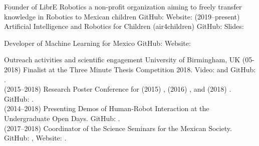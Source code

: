 \documentclass[10pt,a4paper,roman]{moderncv}
\begin{document}
{Founder of LibrE Robotics}
{a non-profit organization aiming to freely transfer 
knowledge in Robotics to Mexican children}
{GitHub: \href{https://github.com/librerobotics}{\faGithubAlt} }
{Website: \href{https://sites.google.com/site/LibreRobotics/}{\faExternalLink}}
{(2019--present) Artificial Intelligence and Robotics for Children (air4children) 
GitHub: \href{https://github.com/librerobotics/air4children}{\faGithubAlt}
Slides: \href{https://github.com/librerobotics/air4children/blob/master/docs/slides/presentation.air4children.pdf}{\faFilePdfO} 
}
{}  



{Developer of Machine Learning for Mexico}
{}
{GitHub: \href{https://github.com/ML4MX}{\faGithubAlt} }
{Website: \href{https://ml4mx.github.io/website/}{\faExternalLink}}
{}  %



{Outreach activities and scientific engagement}
{University of Birmingham, UK}
{}{}
{
(05-2018) Finalist at the Three Minute Thesis Competition 2018.
Video: \href{https://www.youtube.com/watch?v=07ewRYcS-0g}{\faYoutube} and 
GitHub: \href{https://github.com/mxochicale/3mt}{\faGithubAlt}. \\  
(2015--2018) Research Poster Conference for 
(2015) \href{https://github.com/mxochicale/PhD/blob/master/posters/Research_Poster_Conference_UoB/2015/poster/poster.pdf}{\faImage}, 
(2016) \href{https://github.com/mxochicale/PhD/blob/master/posters/Research_Poster_Conference_UoB/2016/poster/poster.pdf}{\faImage}, and  
(2018) \href{https://github.com/mxochicale/PhD/blob/master/posters/Research_Poster_Conference_UoB/2018/poster/main/map479-poster-uob2018.pdf}{\faImage}.
GitHub: \href{https://github.com/mxochicale/PhD/tree/master/posters/Research_Poster_Conference_UoB}{\faGithubAlt}. \\
(2014--2018) Presenting Demos of Human-Robot Interaction at the Undergraduate Open Days.
GitHub: \href{https://github.com/mxochicale/opendayuob-hridemo}{\faGithubAlt}. \\ 
(2017--2018) Coordinator of the Science Seminars for the Mexican Society. 
GitHub: \href{https://github.com/MexicanSocietyUoB}{\faGithubAlt}, 
Website: \href{https://mexicansocietyuob.github.io/seminars/}{\faExternalLink}. \\ 
}






%
\end{document}
